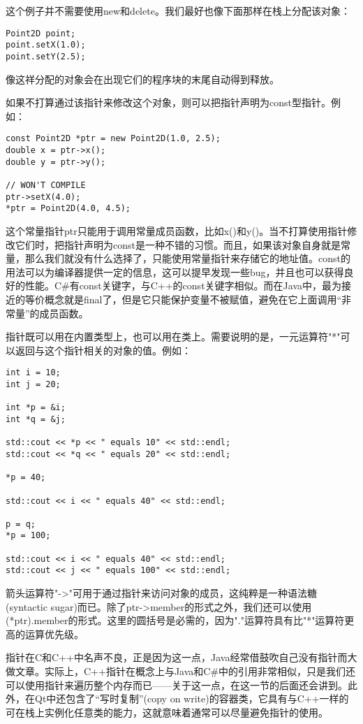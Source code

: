 \documentclass[11pt,oneside]{book}
\begin{document}
\begin{common-format}
这个例子并不需要使用new和delete。我们最好也像下面那样在栈上分配该对象：
\begin{Verbatim}
Point2D point;
point.setX(1.0);
point.setY(2.5);
\end{Verbatim}

像这祥分配的对象会在出现它们的程序块的末尾自动得到释放。

如果不打算通过该指针来修改这个对象，则可以把指针声明为const型指针。例如：
\begin{Verbatim}
const Point2D *ptr = new Point2D(1.0, 2.5);
double x = ptr->x();
double y = ptr->y();

// WON'T COMPILE
ptr->setX(4.0);
*ptr = Point2D(4.0, 4.5);
\end{Verbatim}

这个常量指针ptr只能用于调用常量成员函数，比如x()和y()。当不打算使用指针修改它们时，把指针声明为const是一种不错的习惯。而且，如果该对象自身就是常量，那么我们就没有什么选择了，只能使用常量指针来存储它的地址值。const的用法可以为编译器提供一定的信息，这可以提早发现一些bug，并且也可以获得良好的性能。C\#{}有const关键字，与C++的const关键字相似。而在Java中，最为接近的等价概念就是final了，但是它只能保护变量不被赋值，避免在它上面调用“非常量”的成员函数。

指针既可以用在内置类型上，也可以用在类上。需要说明的是，一元运算符"*"可以返回与这个指针相关的对象的值。例如：
\begin{Verbatim}
int i = 10;
int j = 20;

int *p = &i;
int *q = &j;

std::cout << *p << " equals 10" << std::endl;
std::cout << *q << " equals 20" << std::endl;

*p = 40;

std::cout << i << " equals 40" << std::endl;

p = q;
*p = 100;

std::cout << i << " equals 40" << std::endl;
std::cout << j << " equals 100" << std::endl;
\end{Verbatim}

箭头运算符"->"可用于通过指针来访问对象的成员，这纯粹是一种语法糖(syntactic sugar)而已。除了ptr->member的形式之外，我们还可以使用(*ptr).member的形式。这里的圆括号是必需的，因为"."运算符具有比"*"运算符更高的运算优先级。

指针在C和C++中名声不良，正是因为这一点，Java经常借鼓吹自己没有指针而大做文章。实际上，C++指针在概念上与Java和C\#{}中的引用非常相似，只是我们还可以使用指针来遍历整个内存而已——关于这一点，在这一节的后面还会讲到。此外，在Qt中还包含了“写时复制”(copy on write)的容器类，它具有与C++一样的可在栈上实例化任意类的能力，这就意味着通常可以尽量避免指针的使用。



\end{common-format}
\end{document}

